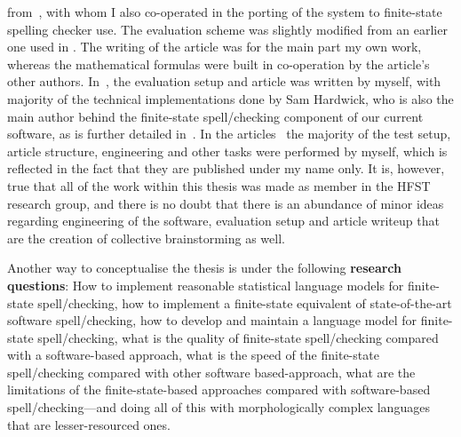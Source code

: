 \documentclass[officiallayout]{unihelcompling}
\begin{document}
from~\citet{silfverberg2010partofspeech}, with whom I also co-operated in the
porting of the system to finite-state spelling checker use. The evaluation
scheme was slightly modified from an earlier one used in
. The writing of the article
 was for the main part  my own work, whereas
the mathematical formulas were built in co-operation by the article's other
authors.  In~, the evaluation setup and article
was written by myself, with majority of the technical implementations done by
Sam Hardwick, who is also the main author behind the finite-state
spell\-/checking component of our current software, as is further detailed
in~\citet{linden2011hfst}.  In the
articles~ the majority
of the test setup, article structure, engineering and other tasks were
performed by myself, which is reflected in the fact that they are published
under my name only. It is, however, true that all of the work within this
thesis was made as member in the HFST research group, and there is no doubt
that there is an abundance of minor ideas regarding engineering of the
software, evaluation setup and article writeup that are the creation of
collective brainstorming as well.

Another way to conceptualise the thesis is under the following \textbf{research
questions}: How to implement reasonable statistical language models for
finite-state spell\-/checking, how to implement a finite-state equivalent of
state-of-the-art software spell\-/checking, how to develop and maintain a
language model for finite-state spell\-/checking, what is the quality of
finite-state spell\-/checking compared with a software-based approach, what is the
speed of the finite-state spell\-/checking compared with other software
based-approach, what are the limitations of the finite-state-based approaches
compared with software-based spell\-/checking---and doing all of this with
morphologically complex languages that are lesser-resourced ones.
\end{document}
